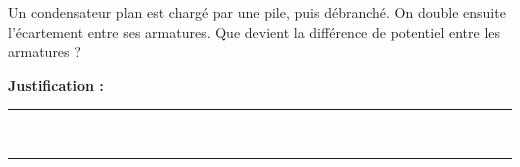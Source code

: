 Un condensateur plan est chargé par une pile, puis débranché. On double ensuite l'écartement entre ses armatures. Que devient la différence de potentiel entre les armatures ?

\choices

\noindent\textbf{Justification :} \hrulefill \\[2.5ex]
\rule{\linewidth}{0.4pt} \\[2.5ex]
\rule{\linewidth}{0.4pt}
\vfill
